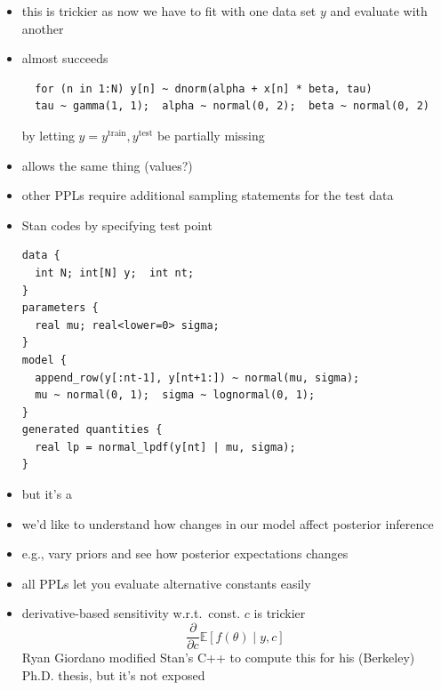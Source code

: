\documentclass[10pt]{report}
\begin{document}
\begin{itemize}
\item this is trickier as now we have to fit with one data set $y$
  and evaluate with another
\item {} almost succeeds
\vspace*{-8pt}
{\footnotesize 
\begin{verbatim}
  for (n in 1:N) y[n] ~ dnorm(alpha + x[n] * beta, tau)
  tau ~ gamma(1, 1);  alpha ~ normal(0, 2);  beta ~ normal(0, 2)
\end{verbatim}
\vspace*{-8pt}}
by letting $y = y^{\textrm{train}}, y^{\textrm{test}}$ be partially
missing
\item {} allows the same thing (values?)
\item other PPLs require additional sampling statements for the test data
\end{itemize}  

\begin{itemize}
\item Stan codes  by specifying test point
\vspace*{-6pt}
{\footnotesize 
\begin{verbatim}
data { 
  int N; int[N] y;  int nt;
}
parameters { 
  real mu; real<lower=0> sigma;
}
model { 
  append_row(y[:nt-1], y[nt+1:]) ~ normal(mu, sigma);
  mu ~ normal(0, 1);  sigma ~ lognormal(0, 1);
}
generated quantities {
  real lp = normal_lpdf(y[nt] | mu, sigma);
}
\end{verbatim}
  \vspace*{-8pt}}
\item but it's a 
\end{itemize}

\begin{itemize}
\item we'd like to understand how changes in our model affect
  posterior inference
\item e.g., vary priors and see how posterior expectations changes
\item all PPLs let you evaluate alternative constants easily
\item derivative-based sensitivity w.r.t.\ const. $c$ is trickier
  \[
    \frac{\partial}{\partial c} \mathbb{E}[f(\theta) \mid y, c]
  \]
  Ryan Giordano modified Stan's C++ to compute this for his (Berkeley)
  Ph.D. thesis, but it's not exposed
\end{itemize}  
\end{document}
